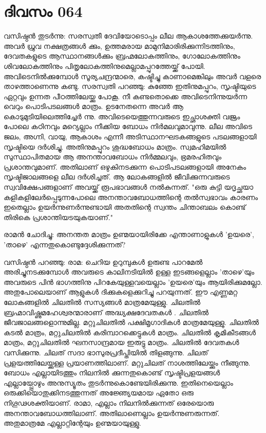  
\section{ദിവസം 064}


വസിഷ്ഠന്‍ തുടര്‍ന്നു: സരസ്വതീ ദേവിയോടൊപ്പം ലീല ആകാശത്തേക്കുയര്‍ന്നു. അവര്‍ ധ്രുവ നക്ഷത്രങ്ങള്‍ ക്കും, ഉത്തമരായ മാമുനിമാരിരിക്കുന്നിടത്തിനും, ദേവതകളുടെ ആസ്ഥാനങ്ങള്‍ക്കും ബ്രഹ്മലോകത്തിനും, ഗോലോകത്തിനും ശിവലോകത്തിനും പിതൃലോകത്തിനുമെല്ലാമപ്പുറത്തേയ്ക്ക്‌ പോയി. അവിടെനില്‍ക്കുമ്പോള്‍ സൂര്യചന്ദ്രന്മാരെ, കഷ്ടിച്ചു കാണാമെങ്കിലും അവര്‍ വളരെ താഴത്താണെന്നു കണ്ടു. സരസ്വതി പറഞ്ഞു: കുഞ്ഞേ ഇതിനുമപ്പുറം, സൃഷ്ടിയുടെ ഏറ്റവും ഉന്നത പീഠത്തിലേയ്ക്കു പോകൂ. നീ കണ്ടതൊക്കെ അവിടെനിന്നുയര്‍ന്ന വെറും പൊടിപടലങ്ങള്‍ മാത്രം. ഉടനേതന്നെ അവര്‍ ആ കൊടുമുടിയിലെത്തിച്ചേര്‍ ന്നു. അവിടെയെത്തുന്നവരുടെ ഇച്ഛാശക്തി വജ്രം പോലെ കഠിനവും മറ്യെല്ലാം നീക്കിയ ബോധം നിര്‍മലവുമാവുന്നു. ലീല അവിടെ ജലം, അഗ്നി, വായു, ആകാശം എന്നീ അടിസ്ഥാനഘടകങ്ങളുടെ പടലങ്ങളായി സൃഷ്ടിയെ ദര്‍ശിച്ചു. അതിനുമപ്പുറം ശുദ്ധബോധം മാത്രം. സ്വമഹിമയില്‍ സുസ്ഥാപിതമായ ആ അനന്താവബോധം നിര്‍മ്മലവും, ഭ്രമരഹിതവും പ്രശാന്തവുമാണ്‌. അതിലാണ്‌ ഒഴുകിനടക്കുന്ന പൊടിപടലങ്ങളായി അനേകം സൃഷ്ടിജാലങ്ങളെ ലീല ദര്‍ശിച്ചത്‌. ആ ലോകങ്ങളില്‍ ജീവിക്കുന്നവരുടെ സ്വവിക്ഷേപങ്ങളാണ്‌ അവയ്ക്ക്‌ രൂപഭാവങ്ങള്‍ നല്‍കുന്നത്‌. "ഒരു കുട്ടി യദൃച്ഛയാ കളികളിലേര്‍പ്പെടുന്നപോലെ അനന്താവബോധത്തിന്റെ തല്‍സ്വഭാവം കാരണം ഇതെല്ലാം ഉയര്‍ന്നുണര്‍ന്നുണ്ടായി അതതിന്റെ സ്വന്തം ചിന്താബലം കൊണ്ട്‌ തിരികെ പ്രശാന്തിയടയുകയാണ്‌."

രാമന്‍ ചോദിച്ചു: അനന്തത മാത്രം ഉണ്മയായിരിക്കേ എന്താണാളുകള്‍ 'ഉയരെ', 'താഴെ' എന്നതുകൊണ്ടുദ്ദേശിക്കുന്നത്‌?

വസിഷ്ഠന്‍ പറഞ്ഞു: രാമ: ചെറിയ ഉറുമ്പുകള്‍ ഉരുണ്ട പാറമേല്‍ അരിച്ചുനടക്കുമ്പോള്‍ അവരുടെ കാലിനടിയില്‍ ഉള്ള ഇടങ്ങളെല്ലാം 'താഴെ'യും അവരുടെ പിന്‍ ഭാഗത്തിനു പിറകേയുള്ളവയെല്ലാം 'ഉയരെ'യും ആയിരിക്കുമല്ലോ. അതുപോലെയാണ്‌ ആളുകള്‍ ദിക്കുകളെക്കുറിച്ചു പറയുന്നത്‌. ഈ എണ്ണമറ്റ ലോകങ്ങളില്‍ ചിലതില്‍ സസ്യങ്ങള്‍ മാത്രമേയുള്ളു. ചിലതില്‍ ബ്രഹ്മാവിഷ്ണുമഹേശ്വരന്മാരാണ്‌ അദ്ധ്യക്ഷദേവതകള്‍ . ചിലതില്‍ ജീവജാലങ്ങളൊന്നുമില്ല. മറ്റുചിലതില്‍ പക്ഷിമൃഗാദികള്‍ മാത്രമേയുള്ളു. ചിലതില്‍ കടല്‍ മാത്രം, മറ്റുചിലതില്‍ കരിമ്പാറക്കെട്ടുകള്‍ മാത്രം. ചിലതില്‍ കൃമികീടങ്ങള്‍ മാത്രം, മറ്റുചിലതില്‍ ഘനസാന്ദ്രമായ ഇരുട്ടു മാത്രം. ചിലതില്‍ ദേവതകള്‍ വസിക്കുന്നു. ചിലത്‌ സദാ ഭാസുരപ്രദീപ്തിയില്‍ തിളങ്ങുന്നു. ചിലത്‌ പ്രളയത്തിലേയ്ക്കുള്ള പ്രയാണത്തിലാണ്‌. മറ്റുചിലത്‌ നാശത്തിലേയ്ക്കും നീങ്ങുന്നു. ബോധം എല്ലായിടത്തും നിലനില്‍ ക്കുന്നതുകൊണ്ട്‌ സൃഷ്ടിപ്രളയങ്ങള്‍ എല്ലായ്പ്പോഴും അനുസ്യൂതം തുടര്‍ന്നുകൊണ്ടേയിരിക്കുന്നു. ഇതിനെയെല്ലാം ഒരുക്കിയൊതുക്കിനടത്തുന്നത്‌ അജ്ഞ്യേയമായ ഏതോ ഒരു നിഗൂഢശക്തിയാണ്‌. രാമാ, എല്ലാം നിലനില്‍ക്കുന്നത്‌ ഒരേയൊരു അനന്താവബോധത്തിലാണ്‌. അതിലാണെല്ലാം ഉയര്‍ന്നുണരുന്നത്‌. അതുമാത്രമേ എല്ലാറ്റിന്റേയും ഉണ്മയായുള്ളു.

